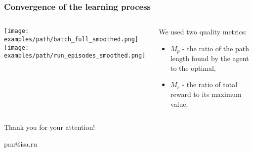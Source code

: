 \documentclass[default]{beamer}
\begin{document}
	\begin{frame}
		\frametitle{Convergence of the learning process}
		\begin{columns}
			\begin{column}{0.65\textwidth}
				\centering
				\texttt{[image: examples/path/batch\_full\_smoothed.png]}
				\vspace*{-10pt}
				\texttt{[image: examples/path/run\_episodes\_smoothed.png]}
			\end{column}
			\begin{column}{0.35\textwidth}
				We used two quality metrics:
				\begin{itemize}
					\item $M_p$ - the ratio of the path length found by the agent to the optimal,
					\item $M_r$ - the ratio of total reward to its maximum value.
				\end{itemize}
			\end{column}
		\end{columns}
		
		
	\end{frame}

	\begin{frame}
		\centering
		\Huge
		Thank you for your attention!
		\normalsize
		\par\bigskip
		\par\bigskip
		\par\bigskip
		pan@isa.ru
	\end{frame}			
\end{document}
